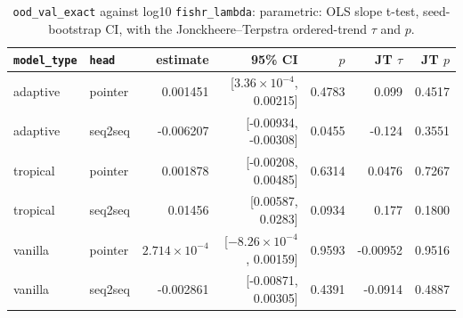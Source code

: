 \documentclass[10pt]{article}
\begin{document}
{\small
\begin{longtable}{llrrrrr}
\caption{\texttt{ood\_val\_exact} against log10 \texttt{fishr\_lambda}: parametric: OLS slope t-test, seed-bootstrap CI, with the Jonckheere--Terpstra ordered-trend $\tau$ and $p$.}\label{tab:trend-ood_val_exact}\\
\toprule
\texttt{model\_type} & \texttt{head} & estimate & 95\% CI & $p$ & JT $\tau$ & JT $p$\\
\midrule
\endhead
adaptive & pointer & 0.001451 & [$3.36\times10^{-4}$, 0.00215] & 0.4783 & 0.099 & 0.4517\\
adaptive & seq2seq & -0.006207 & [-0.00934, -0.00308] & 0.0455 & -0.124 & 0.3551\\
tropical & pointer & 0.001878 & [-0.00208, 0.00485] & 0.6314 & 0.0476 & 0.7267\\
tropical & seq2seq & 0.01456 & [0.00587, 0.0283] & 0.0934 & 0.177 & 0.1800\\
vanilla & pointer & $2.714\times10^{-4}$ & [$-8.26\times10^{-4}$, 0.00159] & 0.9593 & -0.00952 & 0.9516\\
vanilla & seq2seq & -0.002861 & [-0.00871, 0.00305] & 0.4391 & -0.0914 & 0.4887\\
\bottomrule
\end{longtable}
}
\end{document}
